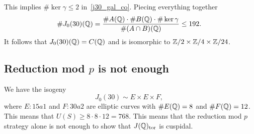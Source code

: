 This implies $\#\ker\gamma\leq 2$ in~\eqref{j30_gal_co}. Piecing everything
together
\[
    \# J_0(30)(\mathbb{Q}) =
    \frac{\#A(\mathbb{Q})\cdot \#B(\mathbb{Q}) \cdot \#\ker\gamma}{\#(A\cap B)(\mathbb{Q})}
    \leq 192.
\]
It follows that $J_0(30)(\mathbb{Q})=C(\mathbb{Q})$ and is isomorphic to $\mathbb{Z}/2\times
\mathbb{Z}/4\times \mathbb{Z}/24$.

\subsection{Reduction mod $p$ is not enough}

We have the isogeny
\[
    J_0(30) \sim E\times E\times F,
\]
where $E:15a1$ and $F:30a2$ are elliptic curves with $\#E(\mathbb{Q})=8$ and
$\#F(\mathbb{Q})=12$. This means that $U(S)\geq 8\cdot 8 \cdot 12=768$. This means
that the reduction mod $p$ strategy alone is not enough to show that
$J(\mathbb{Q})_{\mathrm{tor}}$ is cuspidal.
